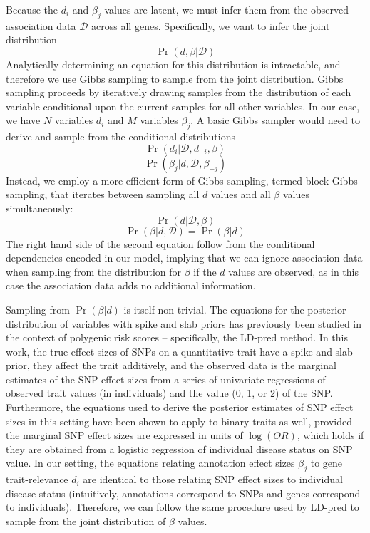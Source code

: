 \documentclass[11pt]{article}
\begin{document}
Because the $d_i$ and $\beta_j$ values are latent, we must infer them
from the observed association data $\mathcal{D}$ across all
genes. Specifically, we want to infer the joint distribution
\[\Pr\left(d,\beta|\mathcal{D}\right)\]
Analytically determining an equation for this distribution is intractable, and therefore
we use Gibbs sampling to sample from the joint distribution. Gibbs
sampling proceeds by iteratively drawing samples from the
distribution of each variable conditional upon the current samples for
all other variables. In our case, we have $N$ variables $d_i$ and $M$
variables $\beta_j$. A basic Gibbs sampler would 
need to derive and sample from the conditional distributions
\[\Pr\left(d_i|\mathcal{D},d_{-i},\beta\right)\]
\[\Pr\left(\beta_j|d,\mathcal{D},\beta_{-j}\right)\]
Instead, we employ a more efficient form of Gibbs sampling, termed
block Gibbs sampling, that iterates between sampling all $d$ values
and all $\beta$ values simultaneously:
\[\Pr\left(d|\mathcal{D},\beta\right)\]
\[\Pr\left(\beta|d,\mathcal{D}\right)=\Pr\left(\beta|d\right)\]
The right hand side of the second equation follow from the
conditional dependencies encoded in our model, implying that we
can ignore association data when sampling from the distribution for
$\beta$ if the $d$ values are observed, as in this case the
association data adds no additional information.

Sampling from $\Pr\left(\beta|d\right)$ is itself non-trivial. The
equations for the posterior distribution of variables with spike and slab
priors has previously been studied in the context of polygenic risk
scores -- specifically, the LD-pred method\cite{}. In this work, the
true effect sizes of SNPs on a quantitative trait have a spike and
slab prior, they affect the trait additively, and the observed data is
the marginal estimates of the SNP effect sizes from a series of
univariate regressions of observed trait values (in individuals) and
the value (0, 1, or 2) of the SNP. Furthermore, the equations used to
derive the posterior estimates of SNP effect sizes in this setting
have been shown to apply to binary traits as well, provided the
marginal SNP effect sizes are expressed in units of $\log(OR)$\cite{}, which
holds if they are obtained from a logistic regression of individual
disease status on SNP value. In our setting, the equations relating
annotation effect sizes $\beta_j$ to gene trait-relevance $d_i$ are
identical to those relating SNP effect sizes to individual disease
status (intuitively, annotations correspond to SNPs and genes
correspond to individuals). Therefore, we can follow the same
procedure used by LD-pred\cite{} to sample from the joint distribution
of $\beta$ values. 
\end{document}
